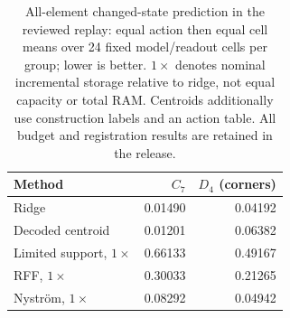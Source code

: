 \begin{table}[htbp]
\caption{All-element changed-state prediction in the reviewed replay: equal action then equal cell means over 24 fixed model/readout cells per group; lower is better. $1\times$ denotes nominal incremental storage relative to ridge, not equal capacity or total RAM. Centroids additionally use construction labels and an action table. All budget and registration results are retained in the release.}
\label{tab:reproduction-compact}\centering\small
\begin{tabular}{lrr}\toprule
Method & $C_7$ & $D_4$ (corners) \\
\midrule
Ridge & 0.01490 & 0.04192 \\
Decoded centroid & 0.01201 & 0.06382 \\
Limited support, $1\times$ & 0.66133 & 0.49167 \\
RFF, $1\times$ & 0.30033 & 0.21265 \\
Nystr\"om, $1\times$ & 0.08292 & 0.04942 \\
\bottomrule\end{tabular}
\end{table}
